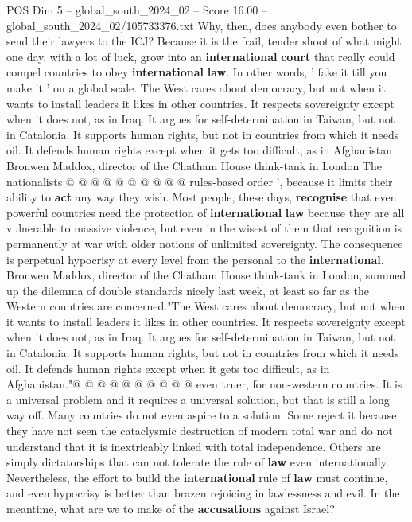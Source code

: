 \begin{textsample}{POS Dim 5 – global\_south\_2024\_02 – Score 16.00 – global\_south\_2024\_02/105733376.txt}
Why, then, does anybody even bother to send their lawyers to the ICJ?
Because it is the frail, tender shoot of what might one day, with a lot of luck, grow into an \textbf{international} \textbf{court} that really could compel countries to obey \textbf{international} \textbf{law}.
In other words, ' fake it till you make it ' on a global scale.
The West cares about democracy, but not when it wants to install leaders it likes in other countries.
It respects sovereignty except when it does not, as in Iraq.
It argues for self-determination in Taiwan, but not in Catalonia.
It supports human rights, but not in countries from which it needs oil.
It defends human rights except when it gets too difficult, as in Afghanistan Bronwen Maddox, director of the Chatham House think-tank in London The nationalists @ @ @ @ @ @ @ @ @ @ rules-based order ', because it limits their ability to \textbf{act} any way they wish.
Most people, these days, \textbf{recognise} that even powerful countries need the protection of \textbf{international} \textbf{law} because they are all vulnerable to massive violence, but even in the wisest of them that recognition is permanently at war with older notions of unlimited sovereignty.
The consequence is perpetual hypocrisy at every level from the personal to the \textbf{international}.
Bronwen Maddox, director of the Chatham House think-tank in London, summed up the dilemma of double standards nicely last week, at least so far as the Western countries are concerned."The West cares about democracy, but not when it wants to install leaders it likes in other countries.
It respects sovereignty except when it does not, as in Iraq.
It argues for self-determination in Taiwan, but not in Catalonia.
It supports human rights, but not in countries from which it needs oil.
It defends human rights except when it gets too difficult, as in Afghanistan."@ @ @ @ @ @ @ @ @ @ even truer, for non-western countries.
It is a universal problem and it requires a universal solution, but that is still a long way off.
Many countries do not even aspire to a solution.
Some reject it because they have not seen the cataclysmic destruction of modern total war and do not understand that it is inextricably linked with total independence.
Others are simply dictatorships that can not tolerate the rule of \textbf{law} even internationally.
Nevertheless, the effort to build the \textbf{international} rule of \textbf{law} must continue, and even hypocrisy is better than brazen rejoicing in lawlessness and evil.
In the meantime, what are we to make of the \textbf{accusations} against Israel?

\end{textsample}
